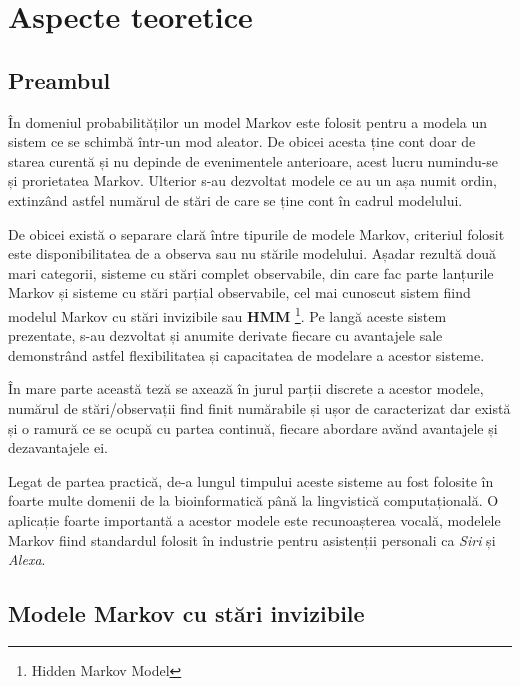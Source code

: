 \chapter{Aspecte teoretice}

\section{Preambul}

În domeniul probabilităților un model Markov este folosit pentru a modela un sistem ce se schimbă într-un mod aleator. De obicei acesta ține cont doar de starea curentă și nu depinde de evenimentele anterioare, acest lucru numindu-se și prorietatea Markov. Ulterior s-au dezvoltat modele ce au un așa numit ordin, extinzând astfel numărul de stări de care se ține cont în cadrul modelului.\par

De obicei există o separare clară între tipurile de modele Markov, criteriul folosit este disponibilitatea de a observa sau nu stările modelului. Așadar rezultă două mari categorii, sisteme cu stări complet observabile, din care fac parte lanțurile Markov și sisteme cu stări parțial observabile, cel mai cunoscut sistem fiind modelul Markov cu stări invizibile sau \textbf{HMM} \footnote{Hidden Markov Model}. Pe langă aceste sistem prezentate, s-au dezvoltat și anumite derivate fiecare cu avantajele sale demonstrând astfel flexibilitatea și capacitatea de modelare a acestor sisteme.\par

În mare parte această teză se axează în jurul parții discrete a acestor modele, numărul de stări/observații find finit numărabile și ușor de caracterizat dar există și o ramură ce se ocupă cu partea continuă, fiecare abordare avănd avantajele și dezavantajele ei.\par

Legat de partea practică, de-a lungul timpului aceste sisteme au fost folosite în foarte multe domenii de la bioinformatică până la lingvistică computațională. O aplicație foarte importantă a acestor modele este recunoașterea vocală, modelele Markov fiind standardul folosit în industrie pentru asistenții personali ca \textit{Siri} și \textit{Alexa}.\par

\section{Modele Markov cu stări invizibile}

